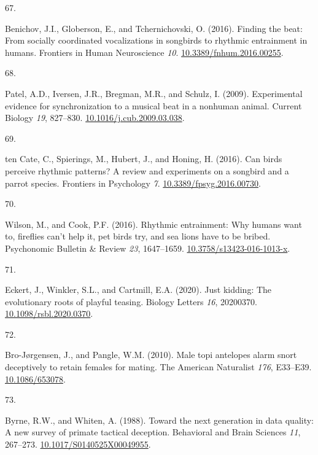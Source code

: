 \documentclass[
  man, donotrepeattitle,floatsintext]{apa6}
\newlength{\cslhangindent}
\newlength{\csllabelwidth}
\newlength{\cslentryspacingunit} %
\newenvironment{CSLReferences}[2] %
 {%
  \setlength{\parindent}{0pt}
  \ifodd #1
  \let\oldpar\par
  \def\par{\hangindent=\cslhangindent\oldpar}
  \fi
  \setlength{\parskip}{#2\cslentryspacingunit}
 }%
 {}
\newcommand{\CSLLeftMargin}[1]{\parbox[t]{\csllabelwidth}{#1}}
\newcommand{\CSLRightInline}[1]{\parbox[t]{\linewidth - \csllabelwidth}{#1}\break}
\begin{document}
\begin{CSLReferences}{0}{0}
\leavevmode{}%
\CSLLeftMargin{67. }%
\CSLRightInline{Benichov, J.I., Globerson, E., and Tchernichovski, O. (2016). Finding the beat: From socially coordinated vocalizations in songbirds to rhythmic entrainment in humans. Frontiers in Human Neuroscience \emph{10}. \href{https://doi.org/10.3389/fnhum.2016.00255}{10.3389/fnhum.2016.00255}.}

\leavevmode{}%
\CSLLeftMargin{68. }%
\CSLRightInline{Patel, A.D., Iversen, J.R., Bregman, M.R., and Schulz, I. (2009). Experimental evidence for synchronization to a musical beat in a nonhuman animal. Current Biology \emph{19}, 827--830. \href{https://doi.org/10.1016/j.cub.2009.03.038}{10.1016/j.cub.2009.03.038}.}

\leavevmode{}%
\CSLLeftMargin{69. }%
\CSLRightInline{ten Cate, C., Spierings, M., Hubert, J., and Honing, H. (2016). Can birds perceive rhythmic patterns? A review and experiments on a songbird and a parrot species. Frontiers in Psychology \emph{7}. \href{https://doi.org/10.3389/fpsyg.2016.00730}{10.3389/fpsyg.2016.00730}.}

\leavevmode{}%
\CSLLeftMargin{70. }%
\CSLRightInline{Wilson, M., and Cook, P.F. (2016). Rhythmic entrainment: Why humans want to, fireflies can't help it, pet birds try, and sea lions have to be bribed. Psychonomic Bulletin \& Review \emph{23}, 1647--1659. \href{https://doi.org/10.3758/s13423-016-1013-x}{10.3758/s13423-016-1013-x}.}

\leavevmode{}%
\CSLLeftMargin{71. }%
\CSLRightInline{Eckert, J., Winkler, S.L., and Cartmill, E.A. (2020). Just kidding: The evolutionary roots of playful teasing. Biology Letters \emph{16}, 20200370. \href{https://doi.org/10.1098/rsbl.2020.0370}{10.1098/rsbl.2020.0370}.}

\leavevmode{}%
\CSLLeftMargin{72. }%
\CSLRightInline{Bro-Jørgensen, J., and Pangle, W.M. (2010). Male topi antelopes alarm snort deceptively to retain females for mating. The American Naturalist \emph{176}, E33--E39. \href{https://doi.org/10.1086/653078}{10.1086/653078}.}

\leavevmode{}%
\CSLLeftMargin{73. }%
\CSLRightInline{Byrne, R.W., and Whiten, A. (1988). Toward the next generation in data quality: A new survey of primate tactical deception. Behavioral and Brain Sciences \emph{11}, 267--273. \href{https://doi.org/10.1017/S0140525X00049955}{10.1017/S0140525X00049955}.}


\end{CSLReferences}
\end{document}
